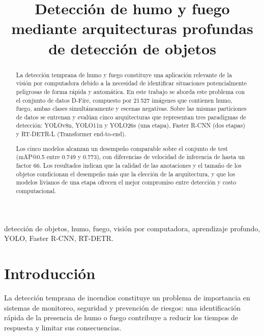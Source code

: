 \documentclass[conference]{IEEEtran}
\begin{document}
\title{Detección de humo y fuego mediante arquitecturas profundas de detección de objetos}

\author{
\and
{}
\and
{}
}

\maketitle

\begin{abstract}
La detección temprana de humo y fuego constituye una aplicación relevante
de la visión por computadora debido a la necesidad de identificar
situaciones potencialmente peligrosas de forma rápida y automática. En este
trabajo se aborda este problema con el conjunto de datos D-Fire, compuesto
por 21\,527 imágenes que contienen humo, fuego, ambas clases
simultáneamente y escenas negativas. Sobre las mismas particiones de datos
se entrenan y evalúan cinco arquitecturas que representan tres paradigmas de
detección: YOLOv8n, YOLO11n y YOLO26s (una etapa), Faster R-CNN (dos etapas)
y RT-DETR-L (Transformer end-to-end).

Los cinco modelos alcanzan un desempeño comparable sobre el conjunto de
test (mAP@0.5 entre 0.749 y 0.773), con diferencias de velocidad de
inferencia de hasta un factor 66. Los resultados indican que la calidad de
las anotaciones y el tamaño de los objetos condicionan el desempeño más que
la elección de la arquitectura, y que los modelos livianos de una etapa
ofrecen el mejor compromiso entre detección y costo computacional.
\end{abstract}

\begin{IEEEkeywords}
detección de objetos, humo, fuego, visión por computadora, aprendizaje profundo,
YOLO, Faster R-CNN, RT-DETR.
\end{IEEEkeywords}

\section{Introducción}
La detección temprana de incendios constituye un problema de importancia en
sistemas de monitoreo, seguridad y prevención de riesgos: una identificación
rápida de la presencia de humo o fuego contribuye a reducir los tiempos de
respuesta y limitar sus consecuencias.
\end{document}

